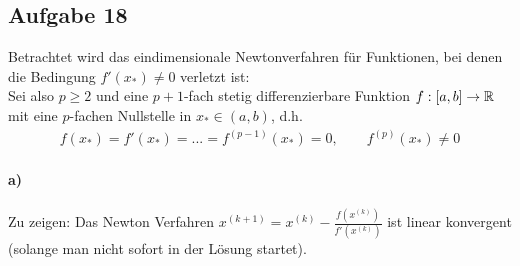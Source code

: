 \subsection*{Aufgabe 18}
Betrachtet wird das eindimensionale Newtonverfahren für Funktionen, bei denen die Bedingung $f'(x_*) \neq 0$ verletzt ist:\\
Sei also $p \ge 2$ und eine $p+1$-fach stetig differenzierbare Funktion $f:[a,b] \rightarrow \mathbb R$ mit eine $p$-fachen Nullstelle in $x_* \in (a,b)$, d.h.
\begin{align*}
f(x_*) = f'(x_*) = ... = f^{(p-1)}(x_*) = 0, \qquad f^{(p)}(x_*) \neq 0
\end{align*}

\paragraph*{a)}
Zu zeigen: Das Newton Verfahren $x^{(k+1)}=x^{(k)} - \frac{f(x^{(k)})}{f'(x^{(k)})}$ ist linear konvergent (solange man nicht sofort in der Lösung startet).\\

